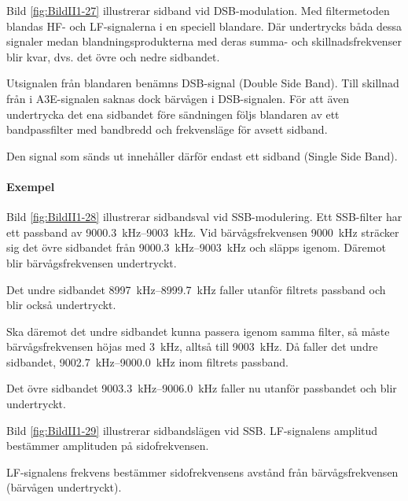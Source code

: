 
Bild \ref{fig:BildII1-27} illustrerar sidband vid DSB-modulation.
Med filtermetoden blandas HF- och LF-signalerna i en speciell blandare.
Där undertrycks båda dessa signaler medan blandningsprodukterna med deras summa-
och skillnadsfrekvenser blir kvar, dvs. det övre och nedre sidbandet.

Utsignalen från blandaren benämns DSB-signal (Double Side Band).
Till skillnad från i A3E-signalen saknas dock bärvågen i DSB-signalen.
För att även undertrycka det ena sidbandet före sändningen följs blandaren
av ett bandpassfilter med bandbredd och frekvensläge för avsett sidband.

Den signal som sänds ut innehåller därför endast ett sidband (Single Side Band).

\paragraph{Exempel}


Bild \ref{fig:BildII1-28} illustrerar sidbandsval vid SSB-modulering.
Ett SSB-filter har ett passband av \SIrange{9000,3}{9003}{\kilo\hertz}.
Vid bärvågsfrekvensen \SI{9000}{\kilo\hertz} sträcker sig det övre sidbandet
från \SIrange{9000,3}{9003}{\kilo\hertz} och släpps igenom.
Däremot blir bärvågsfrekvensen undertryckt.

Det undre sidbandet \SIrange{8997}{8999,7}{\kilo\hertz} faller utanför filtrets
passband och blir också undertryckt.

Ska däremot det undre sidbandet kunna passera igenom samma filter, så måste
bärvågsfrekvensen höjas med \SI{3}{\kilo\hertz}, alltså till
\SI{9003}{\kilo\hertz}.
Då faller det undre sidbandet, \SIrange{9002,7}{9000,0}{\kilo\hertz} inom
filtrets passband.

Det övre sidbandet \SIrange{9003,3}{9006,0}{\kilo\hertz} faller nu utanför
passbandet och blir undertryckt.


Bild \ref{fig:BildII1-29} illustrerar sidbandslägen vid SSB.
LF-signalens amplitud bestämmer amplituden på sidofrekvensen.

LF-signalens frekvens bestämmer sidofrekvensens avstånd från bärvågsfrekvensen
(bärvågen undertryckt).


